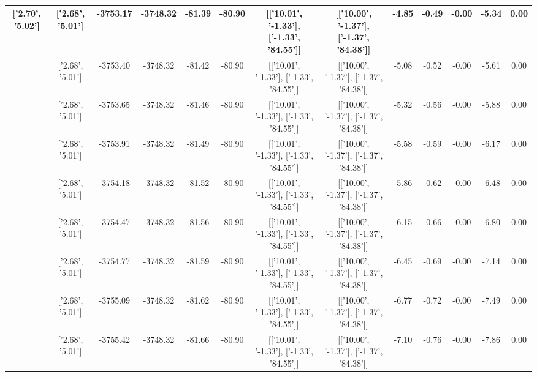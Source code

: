 \begin{table}[htbp]
\begin{adjustbox}{angle=90}
\begin{tabular}{|c|c|c|c|c|c|c|c|c|c|c|c|c|}
 ['2.70', '5.02'] & ['2.68', '5.01'] & -3753.17 & -3748.32 & -81.39 & -80.90 & [['10.01', '-1.33'], ['-1.33', '84.55']] & [['10.00', '-1.37'], ['-1.37', '84.38']] & -4.85 & -0.49 & -0.00 & -5.34 & 0.00\\ \hline
 ['2.70', '5.02'] & ['2.68', '5.01'] & -3753.40 & -3748.32 & -81.42 & -80.90 & [['10.01', '-1.33'], ['-1.33', '84.55']] & [['10.00', '-1.37'], ['-1.37', '84.38']] & -5.08 & -0.52 & -0.00 & -5.61 & 0.00\\ \hline
 ['2.71', '5.02'] & ['2.68', '5.01'] & -3753.65 & -3748.32 & -81.46 & -80.90 & [['10.01', '-1.33'], ['-1.33', '84.55']] & [['10.00', '-1.37'], ['-1.37', '84.38']] & -5.32 & -0.56 & -0.00 & -5.88 & 0.00\\ \hline
 ['2.71', '5.02'] & ['2.68', '5.01'] & -3753.91 & -3748.32 & -81.49 & -80.90 & [['10.01', '-1.33'], ['-1.33', '84.55']] & [['10.00', '-1.37'], ['-1.37', '84.38']] & -5.58 & -0.59 & -0.00 & -6.17 & 0.00\\ \hline
 ['2.71', '5.02'] & ['2.68', '5.01'] & -3754.18 & -3748.32 & -81.52 & -80.90 & [['10.01', '-1.33'], ['-1.33', '84.55']] & [['10.00', '-1.37'], ['-1.37', '84.38']] & -5.86 & -0.62 & -0.00 & -6.48 & 0.00\\ \hline
 ['2.71', '5.02'] & ['2.68', '5.01'] & -3754.47 & -3748.32 & -81.56 & -80.90 & [['10.01', '-1.33'], ['-1.33', '84.55']] & [['10.00', '-1.37'], ['-1.37', '84.38']] & -6.15 & -0.66 & -0.00 & -6.80 & 0.00\\ \hline
 ['2.71', '5.02'] & ['2.68', '5.01'] & -3754.77 & -3748.32 & -81.59 & -80.90 & [['10.01', '-1.33'], ['-1.33', '84.55']] & [['10.00', '-1.37'], ['-1.37', '84.38']] & -6.45 & -0.69 & -0.00 & -7.14 & 0.00\\ \hline
 ['2.71', '5.02'] & ['2.68', '5.01'] & -3755.09 & -3748.32 & -81.62 & -80.90 & [['10.01', '-1.33'], ['-1.33', '84.55']] & [['10.00', '-1.37'], ['-1.37', '84.38']] & -6.77 & -0.72 & -0.00 & -7.49 & 0.00\\ \hline
 ['2.71', '5.02'] & ['2.68', '5.01'] & -3755.42 & -3748.32 & -81.66 & -80.90 & [['10.01', '-1.33'], ['-1.33', '84.55']] & [['10.00', '-1.37'], ['-1.37', '84.38']] & -7.10 & -0.76 & -0.00 & -7.86 & 0.00\\ \hline
            \end{tabular}
        \end{adjustbox}
        \caption{}
        \label{}
    \end{table}
    